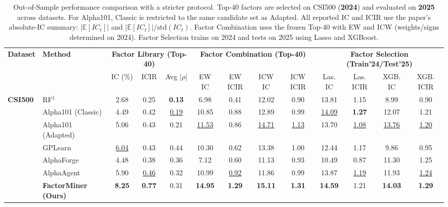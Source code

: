 \begin{table}[t]
  \centering
  \caption{Out-of-Sample performance comparison with a stricter protocol. Top-40 factors are selected on CSI500 (\textbf{2024}) and evaluated on \textbf{2025} across datasets. For Alpha101, Classic is restricted to the same candidate set as Adapted. All reported IC and ICIR use the paper's absolute-IC summary: $|\mathbb{E}[IC_t]|$ and $|\mathbb{E}[IC_t]|/\mathrm{std}(IC_t)$. Factor Combination uses the frozen Top-40 with EW and ICW (weights/signs determined on 2024). Factor Selection trains on 2024 and tests on 2025 using Lasso and XGBoost.}
  \label{tab:main_results_kdd}
  \vskip 0.1in
  \scriptsize
  \setlength{\tabcolsep}{3pt}
  \begin{tabular}{ll ccc cccc cccc}
    \toprule
    \multirow{2}{*}{\textbf{Dataset}} & \multirow{2}{*}{\textbf{Method}} & \multicolumn{3}{c}{\textbf{Factor Library (Top-40)}} & \multicolumn{4}{c}{\textbf{Factor Combination (Top-40)}} & \multicolumn{4}{c}{\textbf{Factor Selection (Train'24/Test'25)}} \\
    \cmidrule(lr){3-5} \cmidrule(lr){6-9} \cmidrule(lr){10-13}
    & & IC (\%) & ICIR & Avg $|\rho|$ & EW IC & EW ICIR & ICW IC & ICW ICIR & Las. IC & Las. ICIR & XGB. IC & XGB. ICIR \\
    \midrule
    \multirow{7}{*}{\textbf{CSI500}}
    & RF$^\ddagger$ & 2.68 & 0.25 & \textbf{0.13} & 6.98 & 0.41 & 12.02 & 0.90 & 13.81 & 1.15 & 8.99 & 0.90 \\
    & Alpha101 (Classic) & 4.49 & 0.42 & \underline{0.19} & 10.85 & 0.88 & 12.89 & 0.99 & \underline{14.09} & \textbf{1.27} & 12.07 & 1.21 \\
    & Alpha101 (Adapted) & 5.06 & 0.43 & 0.21 & \underline{11.53} & 0.86 & \underline{14.71} & \underline{1.13} & 13.70 & \underline{1.08} & \underline{13.76} & \underline{1.20} \\
    & GPLearn & \underline{6.04} & 0.43 & 0.44 & 10.30 & 0.62 & 13.38 & 1.00 & 12.44 & 1.17 & 9.86 & 0.95 \\
    & AlphaForge & 4.48 & 0.38 & 0.36 & 7.12 & 0.60 & 11.13 & 0.93 & 10.49 & 0.87 & 11.30 & 1.25 \\
    & AlphaAgent & 5.90 & \underline{0.46} & 0.32 & 10.99 & \underline{0.92} & 11.86 & 0.99 & 13.87 & \underline{1.19} & 11.93 & \underline{1.24} \\
    & \textbf{FactorMiner (Ours)} & \textbf{8.25} & \textbf{0.77} & 0.31 & \textbf{14.95} & \textbf{1.29} & \textbf{15.11} & \textbf{1.31} & \textbf{14.59} & 1.21 & \textbf{14.03} & \textbf{1.29} \\

\end{tabular}
\end{table}
